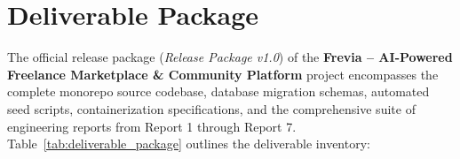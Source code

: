 
\section{Deliverable Package}

The official release package (\textit{Release Package v1.0}) of the \textbf{Frevia -- AI-Powered Freelance Marketplace \& Community Platform} project encompasses the complete monorepo source codebase, database migration schemas, automated seed scripts, containerization specifications, and the comprehensive suite of engineering reports from Report 1 through Report 7. Table~\ref{tab:deliverable_package} outlines the deliverable inventory:

